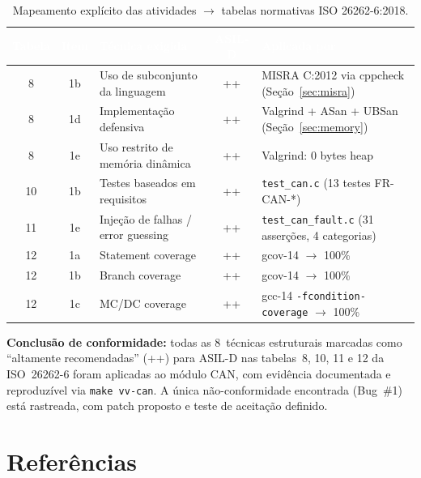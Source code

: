 \documentclass[12pt]{article}
\begin{document}
\begin{table}[H]
\centering
\caption{Mapeamento explícito das atividades $\to$ tabelas normativas ISO 26262-6:2018.}
\footnotesize
\setlength{\tabcolsep}{4pt}
\begin{tabular}{|c|c|l|c|>{\raggedright\arraybackslash}p{6cm}|}
\hline
\rowcolor{sectionblue}
\textcolor{white}{\textbf{Tabela}} &
\textcolor{white}{\textbf{Item}} &
\textcolor{white}{\textbf{Técnica exigida}} &
\textcolor{white}{\textbf{ASIL-D}} &
\textcolor{white}{\textbf{Aplicada por}} \\ \hline
8  & 1b & Uso de subconjunto da linguagem    & ++ & MISRA C:2012 via cppcheck (Seção~\ref{sec:misra}) \\ \hline
8  & 1d & Implementação defensiva            & ++ & Valgrind + ASan + UBSan (Seção~\ref{sec:memory}) \\ \hline
8  & 1e & Uso restrito de memória dinâmica   & ++ & Valgrind: 0 bytes heap \\ \hline
10 & 1b & Testes baseados em requisitos      & ++ & \texttt{test\_can.c} (13 testes FR-CAN-*) \\ \hline
11 & 1e & Injeção de falhas / error guessing & ++ & \texttt{test\_can\_fault.c} (31 asserções, 4 categorias) \\ \hline
12 & 1a & Statement coverage                 & ++ & gcov-14 $\to$ 100\% \\ \hline
12 & 1b & Branch coverage                    & ++ & gcov-14 $\to$ 100\% \\ \hline
12 & 1c & MC/DC coverage                     & ++ & gcc-14 \texttt{-fcondition-coverage} $\to$ 100\% \\ \hline
\end{tabular}
\end{table}

\begin{tcolorbox}[colback=green!5, colframe=green!50!black]
\textbf{Conclusão de conformidade:} todas as 8~técnicas estruturais marcadas como ``altamente
recomendadas'' (++) para ASIL-D nas tabelas~8, 10, 11 e 12 da ISO~26262-6 foram aplicadas ao módulo
CAN, com evidência documentada e reproduzível via \texttt{make vv-can}. A única não-conformidade
encontrada (Bug~\#1) está rastreada, com patch proposto e teste de aceitação definido.
\end{tcolorbox}

\section*{Referências}
\end{document}
